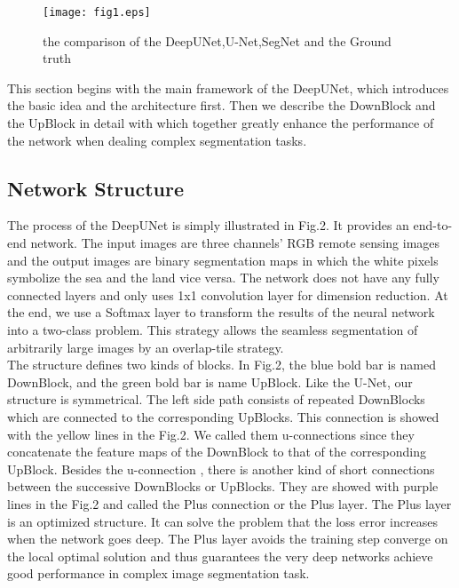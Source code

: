 \documentclass[conference]{IEEEtran}
\begin{document}
\begin{figure}[htbp]
\setlength{\abovecaptionskip}{0pt}
\setlength{\belowcaptionskip}{-10pt}
\centering
\texttt{[image: fig1.eps]}
\caption{the comparison of the DeepUNet,U-Net,SegNet and the Ground truth}
\label{fig1}
\end{figure}

This section begins with the main framework of the DeepUNet, which introduces the basic idea and the architecture first. Then we describe the DownBlock and the UpBlock in detail with which together greatly enhance the performance of the network when dealing complex segmentation tasks.

\subsection{Network Structure}
The process of the DeepUNet is simply illustrated in Fig.2. It provides an end-to-end network. The input images are three channels’ RGB remote sensing images and the output images are binary segmentation maps in which the white pixels symbolize the sea and the land vice versa. The network does not have any fully connected layers and only uses 1x1 convolution layer for dimension reduction. At the end, we use a Softmax layer to transform the results of the neural network into a two-class problem. This strategy allows the seamless segmentation of arbitrarily large images by an overlap-tile strategy.\\

The structure defines two kinds of blocks. In Fig.2, the blue bold bar is named DownBlock, and the green bold bar is name UpBlock. Like the U-Net, our structure is symmetrical. The left side path consists of repeated DownBlocks which are connected to the corresponding UpBlocks. This connection is showed with the yellow lines in the Fig.2. We called them u-connections since they concatenate the feature maps of the DownBlock to that of the corresponding UpBlock. Besides the u-connection , there is another kind of short connections between the successive DownBlocks or UpBlocks. They are showed with purple lines in the Fig.2 and called the Plus connection or the Plus layer. The Plus layer is an optimized structure. It can solve the problem that the loss error increases when the network goes deep. The Plus layer avoids the training step converge on the local optimal solution and thus guarantees the very deep networks achieve good performance in complex image segmentation task.
\end{document}
